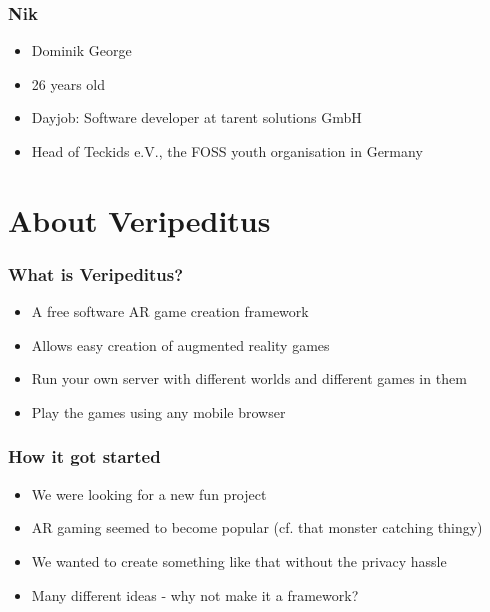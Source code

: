 \documentclass[aspectratio=43]{beamer}
\begin{document}
 \begin{frame}
  \frametitle{Nik}

  \begin{itemize}
   \item{Dominik George}
   \item{26 years old}
   \item{Dayjob: Software developer at tarent solutions GmbH}
   \item{Head of Teckids e.V., the FOSS youth organisation in Germany}
  \end{itemize}
 \end{frame}

 \section{About Veripeditus}

 \begin{frame}
  \frametitle{What is Veripeditus?}

  \begin{itemize}
   \item{A free software AR game creation framework}
   \item{Allows easy creation of augmented reality games}
   \item{Run your own server with different worlds and different games in them}
   \item{Play the games using any mobile browser}
  \end{itemize}
 \end{frame}


 \begin{frame}
  \frametitle{How it got started}

  \begin{itemize}
   \item{We were looking for a new fun project}
   \item{AR gaming seemed to become popular (cf. that monster catching thingy)}
   \item{We wanted to create something like that without the privacy hassle}
   \item{Many different ideas - why not make it a framework?}
  \end{itemize}
 \end{frame}
\end{document}
